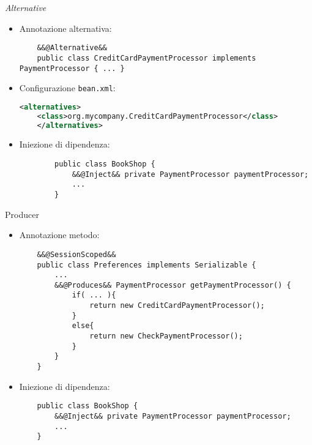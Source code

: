 \begin{frame}[fragile]{\textsl{Alternative}}

\begin{itemize}
\item Annotazione alternativa:
	\begin{lstlisting}
	&&@Alternative&&
	public class CreditCardPaymentProcessor implements PaymentProcessor { ... }
	\end{lstlisting}


\item Configurazione \texttt{bean.xml}:
	\begin{lstlisting}[language=XML, morekeywords={alternatives,class}]
	<alternatives>
	<class>org.mycompany.CreditCardPaymentProcessor</class>
	</alternatives>
	\end{lstlisting}

\item Iniezione di dipendenza:
	\begin{lstlisting}
		public class BookShop {
		    &&@Inject&& private PaymentProcessor paymentProcessor;
		    ...
		}
	\end{lstlisting}

\end{itemize}


\end{frame}





\begin{frame}[fragile]{Producer}

\begin{itemize}
\item Annotazione metodo:
	\begin{lstlisting}
	&&@SessionScoped&&
	public class Preferences implements Serializable {
	    ...
	    &&@Produces&& PaymentProcessor getPaymentProcessor() {
	        if( ... ){
	            return new CreditCardPaymentProcessor();
	        }
	        else{
	            return new CheckPaymentProcessor();
	        }
	    }
	}
	\end{lstlisting}


\item Iniezione di dipendenza:
	\begin{lstlisting}
	public class BookShop {
	    &&@Inject&& private PaymentProcessor paymentProcessor;
	    ...
	}
	\end{lstlisting}

\end{itemize}

\end{frame}



